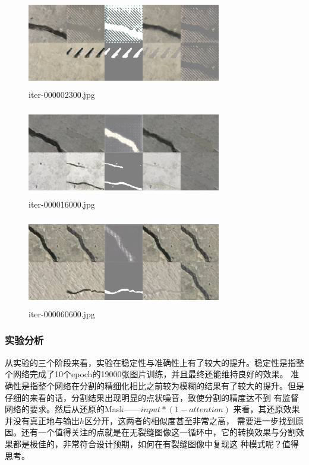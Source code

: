 \begin{figure}[H]
	\centering
	\includegraphics[width=240pt,height=110pt]{0314//iter-000002300}
	\caption{iter-000002300.jpg}
\end{figure}
\begin{figure}[H]
	\centering
	\includegraphics[width=240pt,height=110pt]{0314//iter-000016000}
	\caption{iter-000016000.jpg}
	\label{fig:fig.2}
\end{figure}
\begin{figure}[H]
	\centering
	\includegraphics[width=240pt,height=110pt]{0314//iter-000060600}
	\caption{iter-000060600.jpg}
\end{figure}


\subsubsection{实验分析}

从实验的三个阶段来看，实验在稳定性与准确性上有了较大的提升。稳定性是指整个网络完成了10个epoch的19000张图片训练，并且最终还能维持良好的效果。
准确性是指整个网络在分割的精细化相比之前较为模糊的结果有了较大的提升。但是仔细的来看的话，分割结果出现明显的点状噪音，致使分割的精度达不到
有监督网络的要求。然后从还原的Mask——$input * (1 - attention)$ 来看，其还原效果并没有真正地与输出$h$区分开，这两者的相似度甚至非常之高，
需要进一步找到原因。还有一个值得关注的点就是在无裂缝图像这一循环中，它的转换效果与分割效果都是极佳的，非常符合设计预期，如何在有裂缝图像中复现这
种模式呢？值得思考。

